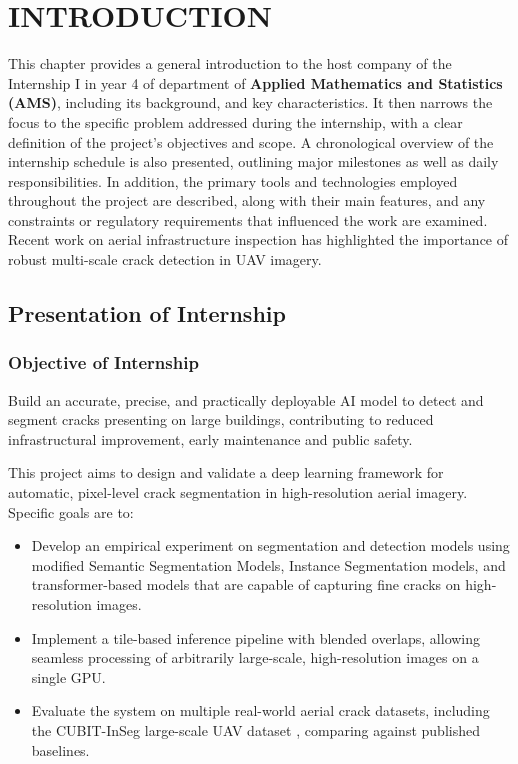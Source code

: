 \chapter{INTRODUCTION}
\label{chap:introduction}

\hs This chapter provides a general introduction to the host company of the Internship I in year 4 of department of \textbf{Applied Mathematics and Statistics (AMS)}, including its background, and key characteristics. It then narrows the focus to the specific problem addressed during the internship, with a clear definition of the project's objectives and scope. A chronological overview of the internship schedule is also presented, outlining major milestones as well as daily responsibilities. In addition, the primary tools and technologies employed throughout the project are described, along with their main features, and any constraints or regulatory requirements that influenced the work are examined. Recent work on aerial infrastructure inspection has highlighted the importance of robust multi-scale crack detection in UAV imagery.

\section{Presentation of Internship}
\subsection{Objective of Internship}
\hs Build an accurate, precise, and practically deployable AI model to detect and segment cracks presenting on
    large buildings, contributing to reduced infrastructural improvement, early maintenance and public safety.
    
    This project aims to design and validate a deep learning framework for automatic, pixel-level crack
    segmentation in high-resolution aerial imagery. Specific goals are to:

\begin{itemize}        
    \item Develop an empirical experiment on segmentation and detection models using modified Semantic Segmentation Models, Instance Segmentation models, and transformer-based models that are capable of capturing fine cracks on high-resolution images.
    \item Implement a tile-based inference pipeline with blended overlaps, allowing seamless processing of arbitrarily large-scale, high-resolution images on a single GPU.
    \item Evaluate the system on multiple real-world aerial crack datasets, including the CUBIT-InSeg large-scale UAV dataset \cite{10-zhao-2026-cubit-inseg}, comparing against published baselines.
\end{itemize}

